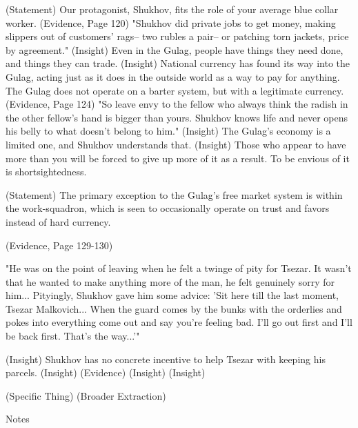 \documentclass[12pt]{article}
\begin{document}
\begin{flushleft}
(Statement) Our protagonist, Shukhov, fits the role of your average blue collar worker.
(Evidence, Page 120) "Shukhov did private jobs to get money, making slippers out of customers' rags-- two rubles a pair-- or patching torn jackets, price by agreement."
(Insight) Even in the Gulag, people have things they need done, and things they can trade. 
(Insight) National currency has found its way into the Gulag, acting just as it does in the outside world as a way to pay for anything. The Gulag does not operate on a barter system, but with a legitimate currency.
(Evidence, Page 124) "So leave envy to the fellow who always think the radish in the other fellow's hand is bigger than yours. Shukhov knows life and never opens his belly to what doesn't belong to him."
(Insight) The Gulag's economy is a limited one, and Shukhov understands that. 
(Insight) Those who appear to have more than you will be forced to give up more of it as a result. To be envious of it is shortsightedness. 

(Statement) The primary exception to the Gulag's free market system is within the work-squadron, which is seen to occasionally operate on trust and favors instead of hard currency.

(Evidence, Page 129-130)
\begin{center}
"He was on the point of leaving when he felt a twinge of pity for Tsezar. 
It wasn't that he wanted to make anything more of the man, he felt genuinely sorry for him... Pityingly, Shukhov gave him some advice: 
'Sit here till the last moment, Tsezar Malkovich... 
When the guard comes by the bunks with the orderlies and pokes into everything come out and say you're feeling bad. 
I'll go out first and I'll be back first. That's the way...'"
\end{center}

(Insight) Shukhov has no concrete incentive to help Tsezar with keeping his parcels. 
(Insight)
(Evidence)
(Insight)
(Insight)

(Specific Thing)
(Broader Extraction)
\begin{center}
Notes
\end{center}


\setlength{\parindent}{0.5in}

\end{flushleft}
\end{document}
